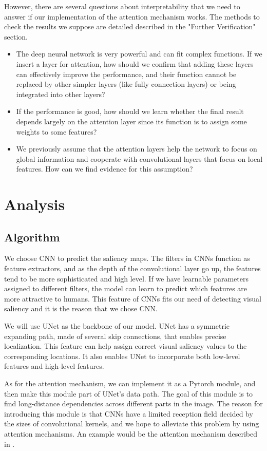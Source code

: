 \documentclass[12pt]{article}
\begin{document}
However, there are several questions about interpretability that we need to answer if our implementation of the attention mechanism works. The methods to check the results we suppose are detailed described in the "Further Verification" section.
\begin{itemize}
\item The deep neural network is very powerful and can fit complex functions. If we insert a layer for attention, how should we confirm that adding these layers can effectively improve the performance, and their function cannot be replaced by other simpler layers (like fully connection layers) or being integrated into other layers?
\item If the performance is good, how should we learn whether the final result depends largely on the attention layer since its function is to assign some weights to some features?
\item We previously assume that the attention layers help the network to focus on global information and cooperate with convolutional layers that focus on local features. How can we find evidence for this assumption?
\end{itemize}

\section{Analysis}
\subsection{Algorithm}
We choose CNN to predict the saliency maps. The filters in CNNs function as feature extractors,
and as the depth of the convolutional layer go up, the features tend to be more sophisticated
and high level. If we have learnable parameters assigned to different filters, the model can
learn to predict which features are more attractive to humans. 
This feature of CNNs fits our need of detecting visual saliency and it is the reason that we 
chose CNN.

We will use UNet \cite{ronnebergerUNetConvolutionalNetworks2015} as the backbone of our model. UNet has a symmetric expanding path, made of
several skip connections, that enables precise localization. This feature can help assign correct visual saliency values to the corresponding locations. It also enables UNet to incorporate both low-level features and
high-level features.


As for the attention mechanism, we can implement it as a Pytorch module, and then make this module
part of UNet's data path. The goal of this module is to find long-distance dependencies across different parts in the image. The reason for introducing this module is that CNNs have a limited
reception field decided by the sizes of convolutional kernels, and we hope to alleviate this problem
by using attention mechanisms. An example would be the attention mechanism described in \cite{zhangSelfAttentionGenerativeAdversarial2019a}.
\end{document}
